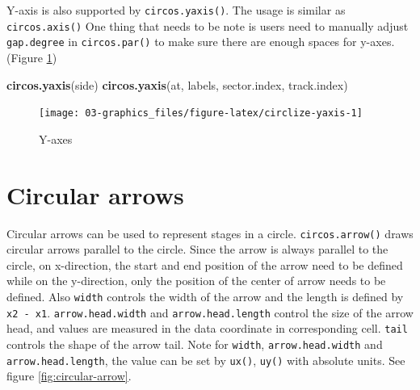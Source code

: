 \documentclass[]{book}
\newenvironment{Shaded}{\begin{snugshade}}{\end{snugshade}}
\newcommand{\KeywordTok}[1]{\textcolor[rgb]{0.13,0.29,0.53}{\textbf{#1}}}
\newcommand{\NormalTok}[1]{#1}
\begin{document}
Y-axis is also supported by \texttt{circos.yaxis()}. The usage is
similar as \texttt{circos.axis()} One thing that needs to be note is
users need to manually adjust \texttt{gap.degree} in
\texttt{circos.par()} to make sure there are enough spaces for y-axes.
(Figure \ref{fig:circlize-yaxis})

\begin{Shaded}
\begin{Highlighting}[]
\KeywordTok{circos.yaxis}\NormalTok{(side)}
\KeywordTok{circos.yaxis}\NormalTok{(at, labels, sector.index, track.index)}
\end{Highlighting}
\end{Shaded}

\begin{figure}

{\centering \texttt{[image: 03-graphics\_files/figure-latex/circlize-yaxis-1]} 

}

\caption{Y-axes}\label{fig:circlize-yaxis}
\end{figure}

\section{Circular arrows}\label{circular-arrows}

Circular arrows can be used to represent stages in a circle.
\texttt{circos.arrow()} draws circular arrows parallel to the circle.
Since the arrow is always parallel to the circle, on x-direction, the
start and end position of the arrow need to be defined while on the
y-direction, only the position of the center of arrow needs to be
defined. Also \texttt{width} controls the width of the arrow and the
length is defined by \texttt{x2\ -\ x1}. \texttt{arrow.head.width} and
\texttt{arrow.head.length} control the size of the arrow head, and
values are measured in the data coordinate in corresponding cell.
\texttt{tail} controls the shape of the arrow tail. Note for
\texttt{width}, \texttt{arrow.head.width} and
\texttt{arrow.head.length}, the value can be set by \texttt{ux()},
\texttt{uy()} with absolute units. See figure \ref{fig:circular-arrow}.
\end{document}
